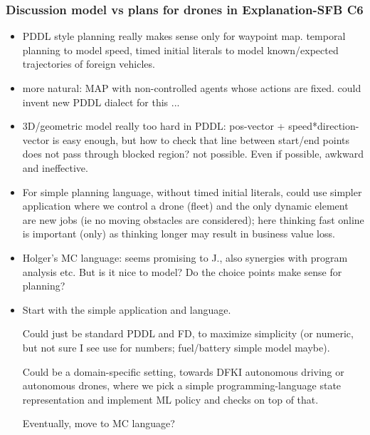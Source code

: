 \subsubsection{Discussion model vs plans for drones in Explanation-SFB C6}

\begin{itemize}

\item PDDL style planning really makes sense only for waypoint
  map. temporal planning to model speed, timed initial literals to
  model known/expected trajectories of foreign vehicles.

\item more natural: MAP with non-controlled agents whose actions are
  fixed. could invent new PDDL dialect for this ...

\item 3D/geometric model really too hard in PDDL: pos-vector +
  speed*direction-vector is easy enough, but how to check that line
  between start/end points does not pass through blocked region? not
  possible. Even if possible, awkward and ineffective.

\item For simple planning language, without timed initial literals,
  could use simpler application where we control a drone (fleet) and
  the only dynamic element are new jobs (ie no moving obstacles are
  considered); here thinking fast online is important (only) as
  thinking longer may result in business value loss.

\item Holger's MC language: seems promising to J., also synergies with
  program analysis etc. But is it nice to model? Do the choice points
  make sense for planning?

\item Start with the simple application and language.

  Could just be standard PDDL and FD, to maximize simplicity (or
  numeric, but not sure I see use for numbers; fuel/battery simple
  model maybe).

  Could be a domain-specific setting, towards DFKI autonomous driving
  or autonomous drones, where we pick a simple programming-language
  state representation and implement ML policy and checks on top of
  that.

  Eventually, move to MC language?

\end{itemize}





















